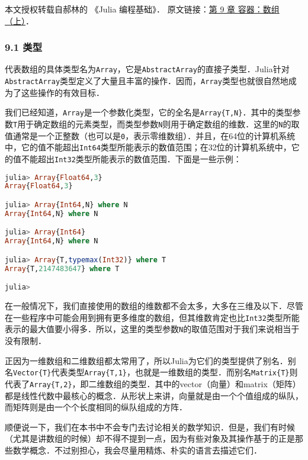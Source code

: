 
本文授权转载自郝林的 《Julia 编程基础》． 原文链接：\href{https://github.com/hyper0x/JuliaBasics/blob/master/book/ch09.md}{第 9 章 容器：数组（上）}．


\subsubsection{9.1 类型}

代表数组的具体类型名为\verb|Array|，它是\verb|AbstractArray|的直接子类型．Julia针对\verb|AbstractArray|类型定义了大量且丰富的操作．因而，\verb|Array|类型也就很自然地成为了这些操作的有效目标．

我们已经知道，\verb|Array|是一个参数化类型，它的全名是\verb|Array{T,N}|．其中的类型参数\verb|T|用于确定数组的元素类型，而类型参数\verb|N|则用于确定数组的维数．这里的\verb|N|的取值通常是一个正整数（也可以是\verb|0|，表示零维数组）．并且，在64位的计算机系统中，它的值不能超出\verb|Int64|类型所能表示的数值范围；在32位的计算机系统中，它的值不能超出\verb|Int32|类型所能表示的数值范围．下面是一些示例：

\begin{lstlisting}[language=julia]
julia> Array{Float64,3}
Array{Float64,3}

julia> Array{Int64,N} where N
Array{Int64,N} where N

julia> Array{Int64}
Array{Int64,N} where N

julia> Array{T,typemax(Int32)} where T
Array{T,2147483647} where T

julia> 
\end{lstlisting}

在一般情况下，我们直接使用的数组的维数都不会太多，大多在三维及以下．尽管在一些程序中可能会用到拥有更多维度的数组，但其维数肯定也比\verb|Int32|类型所能表示的最大值要小得多．所以，这里的类型参数\verb|N|的取值范围对于我们来说相当于没有限制．

正因为一维数组和二维数组都太常用了，所以Julia为它们的类型提供了别名．别名\verb|Vector{T}|代表类型\verb|Array{T,1}|，也就是一维数组的类型．而别名\verb|Matrix{T}|则代表了\verb|Array{T,2}|，即二维数组的类型．其中的vector（向量）和matrix（矩阵）都是线性代数中最核心的概念．从形状上来讲，向量就是由一个个值组成的纵队，而矩阵则是由一个个长度相同的纵队组成的方阵．

顺便说一下，我们在本书中不会专门去讨论相关的数学知识．但是，我们有时候（尤其是讲数组的时候）却不得不提到一点，因为有些对象及其操作基于的正是那些数学概念．不过别担心，我会尽量用精炼、朴实的语言去描述它们．

